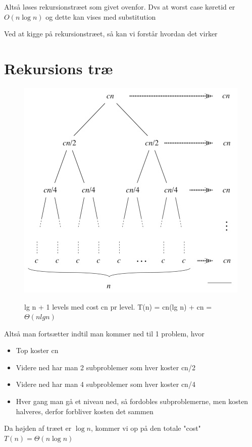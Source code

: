 \documentclass[11pt,a4paper]{report}
\theoremstyle{plain}
\theoremstyle{definition}
\theoremstyle{remark}
\numberwithin{equation}{section}
\begin{document}
Altså løses rekursionstræet som givet ovenfor. Dvs at worst case køretid er $O(n \log n )$ og dette kan vises med substitution

Ved at kigge på rekursionstræet, så kan vi forstår hvordan det virker

\section{Rekursions træ}

\begin{figure}[H]
  \centering
  \includegraphics[scale=1]{rekursion.jpg}\\
  \caption{lg n + 1 levels med cost cn pr level. T(n) = cn(lg n) + cn = $\Theta(nlgn)$}
\end{figure}

Altså man fortsætter indtil man kommer ned til 1 problem, hvor
\begin{itemize}
  \item Top koster cn
  \item Videre ned har man 2 subproblemer som hver koster cn/2
  \item Videre ned har man 4 subproblemer som hver koster cn/4
  \item Hver gang man gå et niveau ned, så fordobles subproblemerne, men kosten halveres, derfor forbliver kosten det sammen
\end{itemize}

Da højden af træet er $\log n$, kommer vi op på den totale "cost" $T(n) = \Theta(n \log n)$
\end{document}
